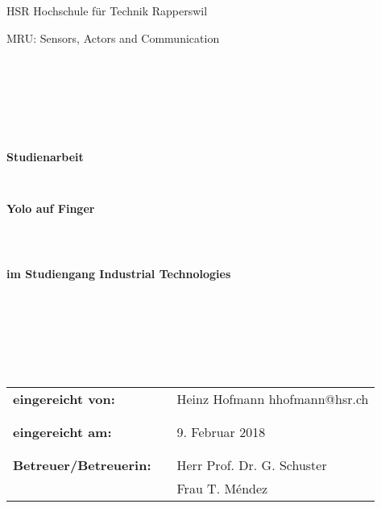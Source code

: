 
\thispagestyle{empty}
\begin{center}
\Large{HSR Hochschule für Technik Rapperswil}\\
\end{center}

\begin{center}
\Large{MRU: Sensors, Actors and Communication}
\end{center}
\begin{verbatim}







\end{verbatim}
\begin{center}
\textbf{\LARGE{Studienarbeit}}
\end{center}
\begin{verbatim}


\end{verbatim}
\begin{center}
\textbf{\Huge{Yolo auf Finger}}
\end{center}
\begin{verbatim}



\end{verbatim}
\begin{center}
\textbf{im Studiengang Industrial Technologies}
\end{center}
\begin{verbatim}







\end{verbatim}

\begin{flushleft}
\begin{tabular}{lll}
\textbf{eingereicht von:} & & Heinz Hofmann \flq{}hhofmann@hsr.ch\frq{}\\
& & \\
& & \\
\textbf{eingereicht am:} & & 9. Februar 2018\\
& & \\
& & \\
\textbf{Betreuer/Betreuerin:} & & Herr Prof. Dr. G. Schuster \\
& & Frau T. Méndez
\end{tabular}
\end{flushleft}









 
